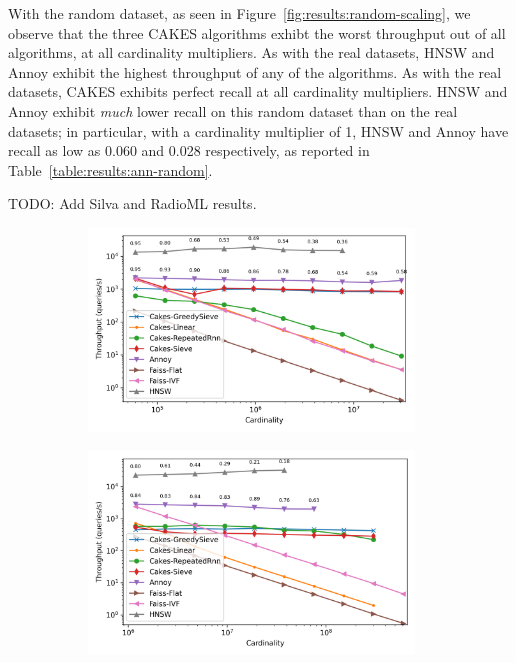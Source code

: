 With the random dataset, as seen in Figure~\ref{fig:results:random-scaling}, we observe that the three CAKES algorithms exhibt the worst throughput out of all algorithms, at all cardinality multipliers. 
As with the real datasets, HNSW and Annoy exhibit the highest throughput of any of the algorithms. 
As with the real datasets, CAKES exhibits perfect recall at all cardinality multipliers. 
HNSW and Annoy exhibit \emph{much} lower recall on this random dataset than on the real datasets; 
in particular, with a cardinality multiplier of 1, HNSW and Annoy have recall as low as 0.060 and 0.028 respectively, as reported in Table~\ref{table:results:ann-random}.



{\color{red} TODO: Add Silva and RadioML results.}

\begin{figure}
\begin{subfigure}[b]{0.47\textwidth}
\includegraphics[width=0.95\textwidth]{plots/fashion-mnist-knn-10.png}
\label{fig:results:fashion-mnist-scaling}
\end{subfigure}%
\begin{subfigure}[b]{0.47\textwidth}
\includegraphics[width=0.95\textwidth]{plots/glove-25-knn-10.png}

\end{subfigure}
\end{figure}
